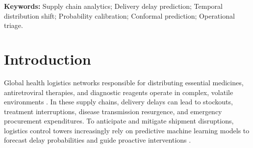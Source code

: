 \documentclass[11pt,a4paper]{article}
\begin{document}
\textbf{Keywords:} Supply chain analytics; Delivery delay prediction; Temporal distribution shift; Probability calibration; Conformal prediction; Operational triage.

\section{Introduction}
Global health logistics networks responsible for distributing essential medicines, antiretroviral therapies, and diagnostic reagents operate in complex, volatile environments \cite{yadav2015health, vledder2019improving}. In these supply chains, delivery delays can lead to stockouts, treatment interruptions, disease transmission resurgence, and emergency procurement expenditures. To anticipate and mitigate shipment disruptions, logistics control towers increasingly rely on predictive machine learning models to forecast delay probabilities and guide proactive interventions \cite{baryannis2019supply}.
\end{document}
